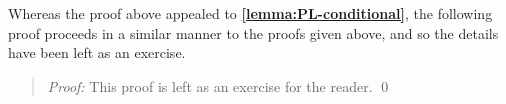 Whereas the proof above appealed to \textbf{\ref{lemma:PL-conditional}}, the following proof proceeds in a similar manner to the proofs given above, and so the details have been left as an exercise.



\begin{quote} 
  \textit{Proof:}
  This proof is left as an exercise for the reader.
  \qed
\end{quote}





